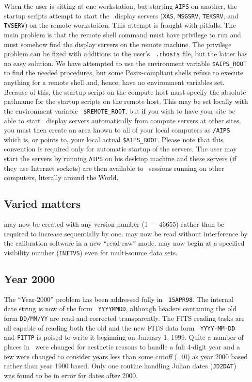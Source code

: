 When the user is sitting at one workstation, but starting {\tt AIPS}
on another, the startup scripts attempt to start the \AIPS\ display
servers ({\tt XAS}, {\tt MSGSRV}, {\tt TEKSRV}, and {\tt TVSERV}) on
the remote workstation.  This attempt is fraught with pitfalls.  The
main problem is that the remote shell command must have privilege to
run and must somehow find the display servers on the remote machine.
The privilege problem can be fixed with additions to the user's {\tt
.rhosts} file, but the latter has no easy solution.  We have attempted
to use the environment variable {\tt \$AIPS\_ROOT} to find the needed
procedures, but some Posix-compliant shells refuse to execute anything
for a remote shell and, hence, have no environment variables set.
Because of this, the startup script on the compute host must specify
the absolute pathname for the startup scripts on the remote host.
This may be set locally with the environment variable {\tt
\$REMOTE\_ROOT}, but if you wish to have your site be able to start
\AIPS\ display servers automatically from compute servers at other
sites, you must then create an area known to all of your local
computers as {\tt /AIPS} which is, or points to, your local actual
\hbox{{\tt \$AIPS\_ROOT}}.  Please note that this convention is
required only for automatic startup of the servers.  The user may
start the servers by running {\tt AIPS} on his desktop machine and
these servers (if they use Internet sockets) are then available to
\AIPS\ sessions running on other computers, literally around the
World.

\subsection{Varied matters}

\begin{description}
 may now be created with any version number (1
   --- 46655) rather than be required to increase sequentially by one.
 may now be read without interference by the
   calibration software in a new ``read-raw'' mode.
 may now begin at a specified visibility
   number ({\tt INITVS}) even for multi-source data sets.
\end{description}

\subsection{Year 2000}

The ``Year-2000'' problem has been addressed fully in \hbox{{\tt
15APR98}}.  The internal date string is now of the form {\tt
YYYYMMDD}, although headers containing the old form {\tt DD/MM/YY} are
read and corrected transparently.  The FITS reading tasks are all
capable of reading both the old and the new FITS data form {\tt
YYYY-MM-DD} and {\tt FITTP} is poised to write it beginning on January
1, 1999.  Quite a number of places in \AIPS\ were changed for aesthetic
reasons to handle a full 4-digit year and a few were changed to
consider years less than some cutoff (\eg\ 40) as year 2000 based
rather than year 1900 based.  Only one routine handling Julian dates
({\tt JD2DAT}) was found to be in error for dates after 2000.

